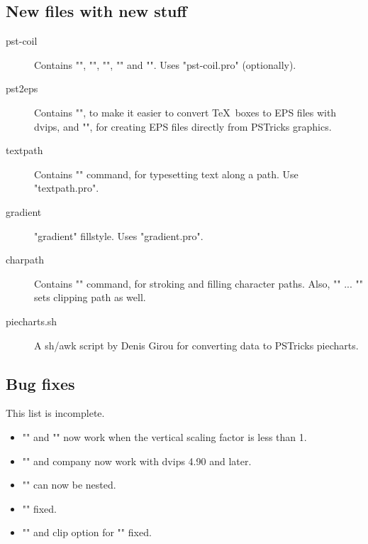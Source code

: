\subsection{New files with new stuff}

\begin{description}

\item[pst-coil]
  Contains "\pscoil", "\psCoil", "\pszigzag", "\nccoil" and "\nczigzag". Uses
"pst-coil.pro" (optionally).

\item[pst2eps]
  Contains "\TeXtoEPS", to make it easier to convert \TeX\ boxes to EPS files
with dvips, and "\PSTtoEPS", for creating EPS files directly from PSTricks
graphics.

\item[textpath]
  Contains "\pstextpath" command, for typesetting text along a path. Use
"textpath.pro".

\item[gradient]
  "gradient" fillstyle. Uses "gradient.pro".

\item[charpath]
  Contains "\pscharpath" command, for stroking and filling character paths.
Also, "\pscharclip" ... "\endpscharclip" sets clipping path as well.

\item[piecharts.sh]
  A sh/awk script by Denis Girou for converting data to PSTricks piecharts.

\end{description}

\subsection{Bug fixes}

This list is incomplete.

\begin{itemize}

\item
  "\scalebox" and "" now work when the vertical scaling factor
    is less than 1.

\item
  "\lput" and company now work with dvips 4.90 and later.

\item
  "\multips" can now be nested.

\item
  "\psclip" fixed.

\item
  "\clipbox" and clip option for "\pspicture" fixed.

\end{itemize}

